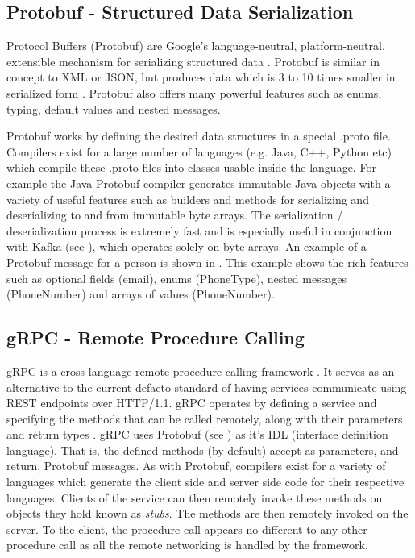 \subsection{Protobuf - Structured Data Serialization}\label{sec:protobuf}
Protocol Buffers (Protobuf) are Google's language-neutral, platform-neutral, extensible mechanism for serializing structured data \cite{protobuf}. Protobuf is similar in concept to XML or JSON, but produces data which is 3 to 10 times smaller in serialized form \cite{protobufSizeStat}. Protobuf also offers many powerful features such as enums, typing, default values and nested messages.

Protobuf works by defining the desired data structures in a special .proto file. Compilers exist for a large number of languages (e.g. Java, C++, Python etc) which compile these .proto files into classes usable inside the language. For example the Java Protobuf compiler generates immutable Java objects with a variety of useful features such as builders and methods for serializing and deserializing to and from immutable byte arrays. The serialization / deserialization process is extremely fast and is especially useful in conjunction with Kafka (see ), which operates solely on byte arrays. An example of a Protobuf message for a person is shown in . This example shows the rich features such as optional fields (email), enums (PhoneType), nested messages (PhoneNumber) and arrays of values (PhoneNumber).



\subsection{gRPC - Remote Procedure Calling}
gRPC is a cross language remote procedure calling framework \cite{gRPC}. It serves as an alternative to the current defacto standard of having services communicate using REST endpoints over HTTP/1.1. gRPC operates by defining a service and specifying the methods that can be called remotely, along with their parameters and return types \cite{gRPCDef}. gRPC uses Protobuf (see ) as it's IDL (interface definition language). That is, the defined methods (by default) accept as parameters, and return, Protobuf messages. As with Protobuf, compilers exist for a variety of languages which generate the client side and server side code for their respective languages. Clients of the service can then remotely invoke these methods on objects they hold known as \textit{stubs}. The methods are then remotely invoked on the server. To the client, the procedure call appears no different to any other procedure call as all the remote networking is handled by the framework. 

